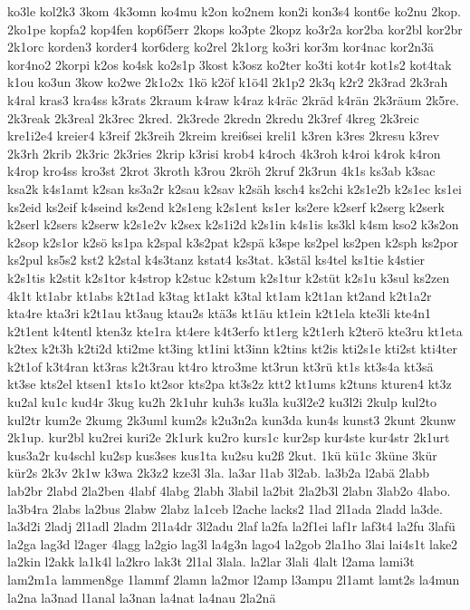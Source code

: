 {ko3le
kol2k3
3kom
4k3omn
ko4mu
k2on
ko2nem
kon2i
kon3s4
kont6e
ko2nu
2kop.
2ko1pe
kopfa2
kop4fen
kop6f5err
2kops
ko3pte
2kopz
ko3r2a
kor2ba
kor2bl
kor2br
2k1orc
korden3
korder4
kor6derg
ko2rel
2k1org
ko3ri
kor3m
kor4nac
kor2n3ä
kor4no2
2korpi
k2os
ko4sk
ko2s1p
3kost
k3osz
ko2ter
ko3ti
kot4r
kot1s2
kot4tak
k1ou
ko3un
3kow
ko2we
2k1o2x
1kö
k2öf
k1ö4l
2k1p2
2k3q
k2r2
2k3rad
2k3rah
k4ral
kras3
kra4ss
k3rats
2kraum
k4raw
k4raz
k4räc
2kräd
k4rän
2k3räum
2k5re.
2k3reak
2k3real
2k3rec
2kred.
2k3rede
2kredn
2kredu
2k3ref
4kreg
2k3reic
kre1i2e4
kreier4
k3reif
2k3reih
2kreim
krei6sei
kreli1
k3ren
k3res
2kresu
k3rev
2k3rh
2krib
2k3ric
2k3ries
2krip
k3risi
krob4
k4roch
4k3roh
k4roi
k4rok
k4ron
k4rop
kro4ss
kro3st
2krot
3kroth
k3rou
2kröh
2kruf
2k3run
4k1s
ks3ab
k3sac
ksa2k
k4s1amt
k2san
ks3a2r
k2sau
k2sav
k2säh
ksch4
ks2chi
k2s1e2b
k2s1ec
ks1ei
ks2eid
ks2eif
k4seind
ks2end
k2s1eng
k2s1ent
ks1er
ks2ere
k2serf
k2serg
k2serk
k2serl
k2sers
k2serw
k2s1e2v
k2sex
k2s1i2d
k2s1in
k4s1is
ks3kl
k4sm
kso2
k3s2on
k2sop
k2s1or
k2sö
ks1pa
k2spal
k3s2pat
k2spä
k3spe
ks2pel
ks2pen
k2sph
ks2por
ks2pul
ks5s2
kst2
k2stal
k4s3tanz
kstat4
ks3tat.
k3stäl
ks4tel
ks1tie
k4stier
k2s1tis
k2stit
k2s1tor
k4strop
k2stuc
k2stum
k2s1tur
k2stüt
k2s1u
k3sul
ks2zen
4k1t
kt1abr
kt1abs
k2t1ad
k3tag
kt1akt
k3tal
kt1am
k2t1an
kt2and
k2t1a2r
kta4re
kta3ri
k2t1au
kt3aug
ktau2s
ktä3s
kt1äu
kt1ein
k2t1ela
kte3li
kte4n1
k2t1ent
k4tentl
kten3z
kte1ra
kt4ere
k4t3erfo
kt1erg
k2t1erh
k2terö
kte3ru
kt1eta
k2tex
k2t3h
k2ti2d
kti2me
kt3ing
kt1ini
kt3inn
k2tins
kt2is
kti2s1e
kti2st
kti4ter
k2t1of
k3t4ran
kt3ras
k2t3rau
kt4ro
ktro3me
kt3run
kt3rü
kt1s
kt3s4a
kt3sä
kt3se
kts2el
ktsen1
kts1o
kt2sor
kts2pa
kt3s2z
ktt2
kt1ums
k2tuns
kturen4
kt3z
ku2al
ku1c
kud4r
3kug
ku2h
2k1uhr
kuh3s
ku3la
ku3l2e2
ku3l2i
2kulp
kul2to
kul2tr
kum2e
2kumg
2k3uml
kum2s
k2u3n2a
kun3da
kun4s
kunst3
2kunt
2kunw
2k1up.
kur2bl
ku2rei
kuri2e
2k1urk
ku2ro
kurs1c
kur2sp
kur4ste
kur4str
2k1urt
kus3a2r
ku4schl
ku2sp
kus3ses
kus1ta
ku2su
ku2ß
2kut.
1kü
kü1c
3küne
3kür
kür2s
2k3v
2k1w
k3wa
2k3z2
kze3l
3la.
la3ar
l1ab
3l2ab.
la3b2a
l2abä
2labb
lab2br
2labd
2la2ben
4labf
4labg
2labh
3labil
la2bit
2la2b3l
2labn
3lab2o
4labo.
la3b4ra
2labs
la2bus
2labw
2labz
la1ceb
l2ache
lacks2
1lad
2l1ada
2ladd
la3de.
la3d2i
2ladj
2l1adl
2ladm
2l1a4dr
3l2adu
2laf
la2fa
la2f1ei
laf1r
laf3t4
la2fu
3lafü
la2ga
lag3d
l2ager
4lagg
la2gio
lag3l
la4g3n
lago4
la2gob
2la1ho
3lai
lai4s1t
lake2
la2kin
l2akk
la1k4l
la2kro
lak3t
2l1al
3lala.
la2lar
3lali
4lalt
l2ama
lami3t
lam2m1a
lammen8ge
1lammf
2lamn
la2mor
l2amp
l3ampu
2l1amt
lamt2s
la4mun
la2na
la3nad
l1anal
la3nan
la4nat
la4nau
2la2nä
}
